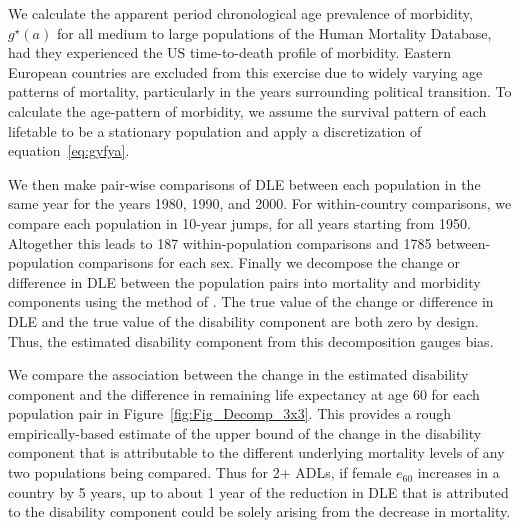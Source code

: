 \documentclass[12pt,oneside,a4paper]{article} %
\begin{document}
We calculate the apparent period chronological age prevalence of morbidity,
$g^\star(a)$ for all medium to large populations of the Human Mortality
Database, had they experienced the US time-to-death profile of morbidity. Eastern European countries are excluded from this exercise due to widely varying
age patterns of mortality, particularly in the years surrounding political
transition. To calculate the age-pattern of morbidity, we assume the survival
pattern of each lifetable to be a stationary population and apply a
discretization of equation~\eqref{eq:gyfya}. 

We then make pair-wise comparisons of DLE between each population in
the same year for the years 1980, 1990, and 2000.
For within-country comparisons, we compare each population in
10-year jumps, for all years starting from 1950. Altogether this leads to
187 within-population comparisons and 1785 between-population comparisons for
each sex. Finally we decompose the change or difference in DLE between the
population pairs into mortality and morbidity components using the method of
\citet{Andreev2002}. The true value of the change or difference in DLE and the true value of the disability component
are both zero by design. Thus, the estimated disability component from this
decomposition gauges bias.

We compare the association between the change in the estimated disability
component and the difference in remaining life expectancy at age 60 for each population pair in
Figure~\ref{fig:Fig_Decomp_3x3}. This provides a rough
empirically-based estimate of the upper bound of the change in the disability
component that is attributable to the different underlying mortality levels
of any two populations being compared. Thus for 2+ ADLs, if female $e_{60}$ increases in a
country by 5 years, up to about 1 year of the reduction in DLE that is
attributed to the disability component could be solely arising from the decrease
in mortality. 
\end{document}
